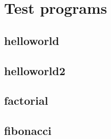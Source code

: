 \section{Test programs}
\label{testprograms}

\subsection{helloworld}



\subsection{helloworld2}



\subsection{factorial}



\subsection{fibonacci}




